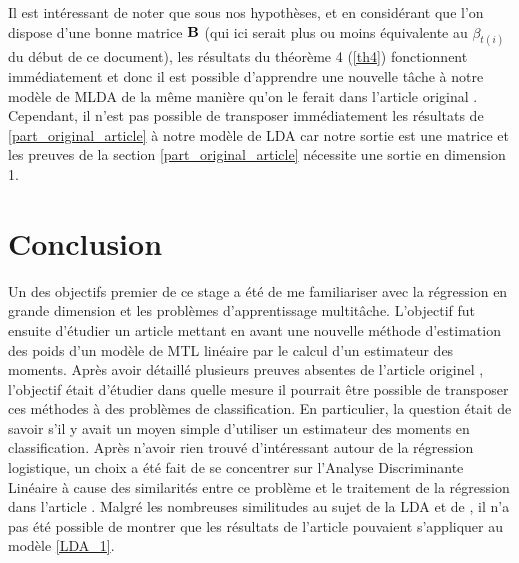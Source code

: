 \documentclass[12pt]{article}
\begin{document}
Il est intéressant de noter que sous nos hypothèses, et en considérant que l'on dispose d'une bonne matrice ${\bf B}$ (qui ici serait plus ou moins équivalente au $\beta_{t(i)}$ du début de ce document), les résultats du théorème 4 (\ref{th4}) fonctionnent immédiatement et donc il est possible d'apprendre une nouvelle tâche à notre modèle de MLDA de la même manière qu'on le ferait dans l'article original \cite{MTLR_1}.\\
Cependant, il n'est pas possible de transposer immédiatement les résultats de \ref{part_original_article} à notre modèle de LDA car notre sortie est une matrice et les preuves de la section \ref*{part_original_article} nécessite une sortie en dimension 1. 

\section{Conclusion}
Un des objectifs premier de ce stage a été de me familiariser avec la régression en grande dimension et les problèmes d'apprentissage multitâche. L'objectif fut ensuite d'étudier un article mettant en avant une nouvelle méthode d'estimation des poids d'un modèle de MTL linéaire par le calcul d'un estimateur des moments. Après avoir détaillé plusieurs preuves absentes de l'article originel \cite{MTLR_1}, l'objectif était d'étudier dans quelle mesure il pourrait être possible de transposer ces méthodes à des problèmes de classification. En particulier, la question était de savoir s'il y avait un moyen simple d'utiliser un estimateur des moments en classification. Après n'avoir rien trouvé d'intéressant autour de la régression logistique, un choix a été fait de se concentrer sur l'Analyse Discriminante Linéaire à cause des similarités entre ce problème et le traitement de la régression dans l'article \cite{MTLR_1}. Malgré les nombreuses similitudes au sujet de la LDA et de \cite{MTLR_1}, il n'a pas été possible de montrer que les résultats de l'article \cite{MTLR_1} pouvaient s'appliquer au modèle \ref{LDA_1}.
{}

\end{document}
